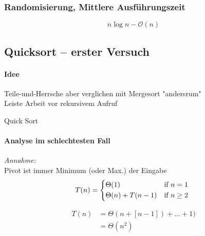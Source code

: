 \documentclass[a4paper]{scrartcl}
\begin{document}
	\subsubsection{Randomisierung, Mittlere Ausführungszeit} 
	\[ n \log n - \mathcal{O} (n) \]
	
	\subsection{Quicksort – erster Versuch}
	
	\paragraph{Idee}
	Teile-und-Herrsche aber verglichen mit Mergesort "andersrum"\\
	Leiste Arbeit vor rekursivem Aufruf\\
	
	\begin{algorithm}
		\caption{Quick Sort}
		\DontPrintSemicolon
		
	\end{algorithm}

	\paragraph{Analyse im schlechtesten Fall}
	\emph{Annahme:}\\
	Pivot ist immer Minimum (oder Max.) der Eingabe \\
	\[
		T(n) = 
	\begin{dcases*}
		\Theta(1) & if \(n = 1\)\\
		\Theta(n) +T(n-1) & if \(n \geq 2\)
	\end{dcases*}
	\]
	
	\begin{align*}
		T(n) &= \Theta(n + [n - 1]) + \dots +1) \\
		&= \Theta(n^2)\\
	\end{align*}
	
\end{document}
